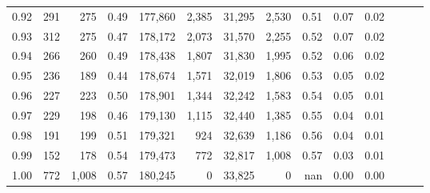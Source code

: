 \begin{tabular}{rrrrrrrrrrrrrr}
0.92 &    291 &    275 &  0.49 &  177,860 &    2,385 &  31,295 &   2,530 &  0.51 &  0.07 &      0.02 \\
0.93 &    312 &    275 &  0.47 &  178,172 &    2,073 &  31,570 &   2,255 &  0.52 &  0.07 &      0.02 \\
0.94 &    266 &    260 &  0.49 &  178,438 &    1,807 &  31,830 &   1,995 &  0.52 &  0.06 &      0.02 \\
0.95 &    236 &    189 &  0.44 &  178,674 &    1,571 &  32,019 &   1,806 &  0.53 &  0.05 &      0.02 \\
0.96 &    227 &    223 &  0.50 &  178,901 &    1,344 &  32,242 &   1,583 &  0.54 &  0.05 &      0.01 \\
0.97 &    229 &    198 &  0.46 &  179,130 &    1,115 &  32,440 &   1,385 &  0.55 &  0.04 &      0.01 \\
0.98 &    191 &    199 &  0.51 &  179,321 &      924 &  32,639 &   1,186 &  0.56 &  0.04 &      0.01 \\
0.99 &    152 &    178 &  0.54 &  179,473 &      772 &  32,817 &   1,008 &  0.57 &  0.03 &      0.01 \\
1.00 &    772 &  1,008 &  0.57 &  180,245 &        0 &  33,825 &       0 &   nan &  0.00 &      0.00 \\
\bottomrule
\end{tabular}
